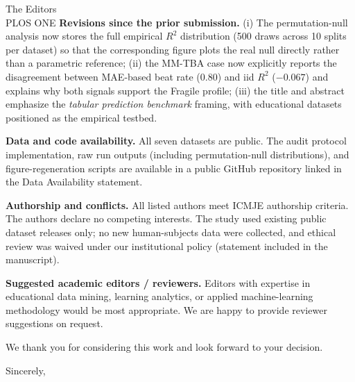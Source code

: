 \documentclass[11pt]{letter}
\begin{document}
\begin{letter}{The Editors\\PLOS ONE}
\textbf{Revisions since the prior submission.} (i) The permutation-null
analysis now stores the full empirical $R^2$ distribution (500 draws
across 10 splits per dataset) so that the corresponding figure plots the
real null directly rather than a parametric reference; (ii) the MM-TBA
case now explicitly reports the disagreement between MAE-based beat rate
($0.80$) and iid $R^2$ ($-0.067$) and explains why both signals support
the Fragile profile; (iii) the title and abstract emphasize the
\textit{tabular prediction benchmark} framing, with educational datasets
positioned as the empirical testbed.

\textbf{Data and code availability.} All seven datasets are public.
The audit protocol implementation, raw run outputs (including
permutation-null distributions), and figure-regeneration scripts are
available in a public GitHub repository linked in the Data Availability
statement.

\textbf{Authorship and conflicts.} All listed authors meet ICMJE
authorship criteria. The authors declare no competing interests.
The study used existing public dataset releases only; no new human-subjects
data were collected, and ethical review was waived under our institutional
policy (statement included in the manuscript).

\textbf{Suggested academic editors / reviewers.} Editors with expertise in
educational data mining, learning analytics, or applied
machine-learning methodology would be most appropriate. We are happy to
provide reviewer suggestions on request.

We thank you for considering this work and look forward to your decision.

\closing{Sincerely,}

\end{letter}
\end{document}
